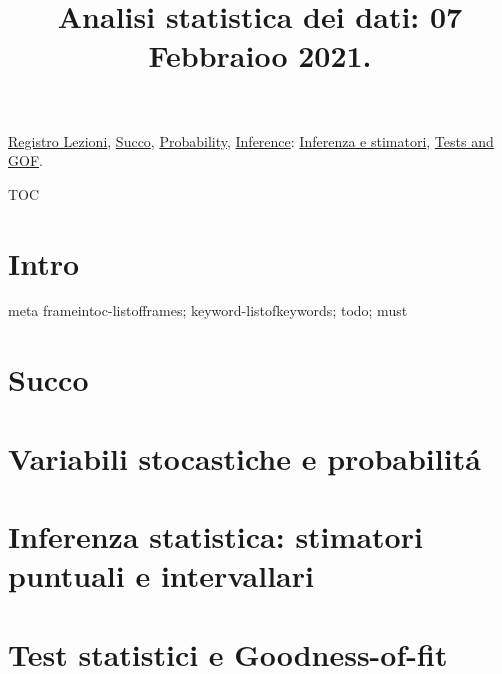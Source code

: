 \documentclass[t,10pt,xcolor={usenames},fleqn]{beamer}
\title{Analisi statistica dei dati: 07 Febbraioo 2021.}
\begin{document}
\setcounter{tocdepth}{2}

\begin{frame}
  \titlepage
  \hyperlink{reg}{Registro Lezioni}, \hyperlink{succo}{Succo}, \hyperlink{statdistro}{Probability}, \hyperlink{inference}{Inference}: \hyperlink{inferenceparadigm}{Inferenza e stimatori}, \hyperlink{testgof}{Tests and GOF}.
\end{frame}

\begin{frame}{TOC}
\tableofcontents[onlyparts]
\listofframes
\end{frame}

\part{Intro}%
\begin{frame}{meta}
frameintoc-listofframes; keyword-listofkeywords; todo; must
\end{frame}



\part{Succo}%


\part{Variabili stocastiche e probabilit\'a}%


\part{Inferenza statistica: stimatori puntuali e intervallari}%


\part{Test statistici e Goodness-of-fit}%

\end{document}
